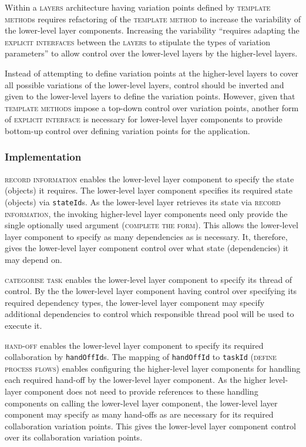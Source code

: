 \documentclass[prodmode]{style/acmlarge}
\begin{document}
Within a \textsc{layers} architecture having variation points defined by
\textsc{template method}s requires refactoring of the \textsc{template method}
to increase the variability of the lower-level layer components.  Increasing the
variability ``requires adapting the \textsc{explicit interfaces} between the
\textsc{layers} to stipulate the types of variation parameters'' \cite[p.
5]{ioc} to allow control over the lower-level layers by the higher-level layers.

Instead of attempting to define variation points at the higher-level layers to
cover all possible variations of the lower-level layers, control should be
inverted and given to the lower-level layers to define the variation points. 
However, given that \textsc{template methods} impose a top-down control over
variation points, another form of \textsc{explicit interface} is necessary for
lower-level layer components to provide bottom-up control over defining
variation points for the application.



\subsubsection*{Implementation}

\textsc{record information} enables the lower-level layer component to specify
the state (objects) it requires.  The lower-level layer component specifies its
required state (objects) via \texttt{stateId}s.  As the lower-level layer
retrieves its state via \textsc{record information}, the invoking higher-level
layer components need only provide the single optionally used argument
(\textsc{complete the form}).  This allows the lower-level layer component to
specify as many dependencies as is necessary.  It, therefore, gives the
lower-level layer component control over what state (dependencies) it
may depend on.

\textsc{categorise task} enables the lower-level layer component to specify its
thread of control.  By the the lower-level layer component having control over
specifying its required dependency types, the lower-level layer component may
specify additional dependencies to control which responsible thread pool will be
used to execute it.

\textsc{hand-off} enables the lower-level layer component to specify its
required collaboration by \texttt{handOffId}s.  The mapping of
\texttt{handOffId} to \texttt{taskId} (\textsc{define process flows}) enables
configuring the higher-level layer components for handling each required
hand-off by the lower-level layer component.  As the higher level-layer
component does not need to provide references to these handling components on
calling the lower-level layer component, the lower-level layer component may
specify as many hand-offs as are necessary for its required collaboration
variation points.  This gives the lower-level layer component control over its
collaboration variation points.
\end{document}
